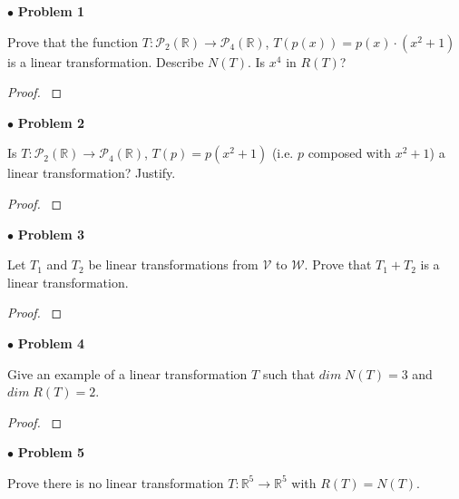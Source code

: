 \documentclass{article}
\begin{document}
$ \bullet$ \textbf{Problem 1}
\medskip

\begin{itshape}
Prove that the function $T: \mathcal{P}_2(\mathbb{R}) \to \mathcal{P}_4(\mathbb{R})$, $T(p(x)) = p(x) \cdot (x^2 +1)$ is a linear transformation. Describe $N(T)$. Is $x^4$ in $R(T)$?
\end{itshape}
\medskip

\begin{proof}
$ $\newline
\end{proof}

\newpage
$ \bullet$ \textbf{Problem 2}
\medskip

\begin{itshape}
Is $T: \mathcal{P}_2(\mathbb{R}) \to \mathcal{P}_4(\mathbb{R})$, $T(p) = p(x^2+1)$ (i.e. $p$ composed with $x^2+1$) a linear transformation? Justify.
\end{itshape}
\medskip

\begin{proof}
$ $\newline
\end{proof}

\newpage
$ \bullet$ \textbf{Problem 3}
\medskip

\begin{itshape}
Let $T_1$ and $T_2$ be linear transformations from $\mathcal{V}$ to $\mathcal{W}$. Prove that $T_1 + T_2$ is a linear transformation.
\end{itshape}
\medskip

\begin{proof}
$ $\newline
\end{proof}

\newpage
$ \bullet$ \textbf{Problem 4}
\medskip

\begin{itshape}
Give an example of a linear transformation $T$ such that $dim \; N(T) = 3$ and  $dim \; R(T) =2$.
\end{itshape}
\medskip

\begin{proof}
$ $\newline
\end{proof}

\newpage
$ \bullet$ \textbf{Problem 5}
\medskip

\begin{itshape}
Prove there is no linear transformation $T: \mathbb{R}^5 \to \mathbb{R}^5$ with $R(T) = N(T)$.
\end{itshape}
\medskip
\end{document}
